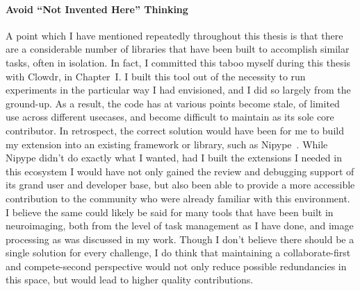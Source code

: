 \paragraph*{Avoid ``Not Invented Here'' Thinking}
A point which I have mentioned repeatedly throughout this thesis is that there are a considerable number of
libraries that have been built to accomplish similar tasks, often in isolation. In fact, I committed this taboo
myself during this thesis with Clowdr, in Chapter~I. I built this tool out of the necessity to run experiments in
the particular way I had envisioned, and I did so largely from the ground-up. As a result, the code has at various
points become stale, of limited use across different usecases, and become difficult to maintain as its sole core
contributor. In retrospect, the correct solution would have been for me to build my extension into an existing
framework or library, such as Nipype~\cite{gorgolewski2011nipype}. While Nipype didn't do exactly what I wanted,
had I built the extensions I needed in this ecosystem I would have not only gained the review and debugging support
of its grand user and developer base, but also been able to provide a more accessible contribution to the community
who were already familiar with this environment. I believe the same could likely be said for many tools that have
been built in neuroimaging, both from the level of task management as I have done, and image processing as was
discussed in my work. Though I don't believe there should be a single solution for every challenge, I do think that
maintaining a collaborate-first and compete-second perspective would not only reduce possible redundancies in this
space, but would lead to higher quality contributions.
